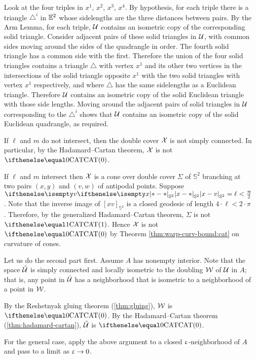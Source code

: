 Look at the four triples in $x^1$, $x^2$, $x^3$, $x^4$.
By  hypothesis, for each triple there is a triangle ${\triangle}^i$ in $\mathbb{E}^2$ whose  sidelengths are the three distances between pairs.
By the Arm Lemma, for each triple, $\mathcal{U}$ contains an isometric copy of the corresponding solid triangle.
Consider adjacent pairs of these solid triangles in $\mathcal{U}$, with common sides moving around the sides of the quadrangle in order.
The fourth solid triangle has a common side with the first.
Therefore the union of the four solid triangles contains a triangle $\triangle$ with vertex $x^1$ and its other two vertices in the intersections of the solid  triangle opposite $x^1$ with the two solid triangles with vertex $x^1$ respectively, and where $\triangle$ has the same sidelengths as a Euclidean triangle.
Therefore $\mathcal{U}$ contains an isometric copy of the solid Euclidean triangle with those side lengths.
Moving around the adjacent pairs of solid triangles in $\mathcal{U}$ corresponding to the ${\triangle}^i$ shows that $\mathcal{U}$ contains an isometric copy of the solid Euclidean quadrangle, as required.

If $\ell$ and $m$ do not intersect, then the double cover $\mathcal{X}$ is not simply connected.
In particular, by the Hadamard--Cartan theorem, $\mathcal{X}$ is not $\CAT0$.

If $\ell$ and $m$ intersect then $\mathcal{X}$ is a cone over double cover $\Sigma$ of $\mathbb{S}^2$ branching at two pairs $(x,y)$ and $(v,w)$ of antipodal points.
Suppose $\dist{x}{v}{\mathbb{S}^2}=\ell<\tfrac\pi2$.
Note that the inverse image of $[xv]_{\mathbb{S}^2}$ is a closed geodesic of length $4\cdot\ell<2\cdot\pi$.
Therefore, by the generalized Hadamard--Cartan theorem, $\Sigma$ is not $\CAT1$. Hence $\mathcal{X}$ is not $\CAT0$ by Theorem \ref{thm:warp-curv-bound:cat}  on curvature of cones.

Let us do the second part first.
Assume $A$ has nonempty interior. 
Note that the space $\tilde{\mathcal{U}}$ is simply connected and locally isometric to the doubling $\mathcal{W}$ of $\mathcal{U}$ in $A$;
that is, any point in $\tilde{\mathcal{U}}$ has a neighborhood 
that is isometric to a neighborhood of a point in $\mathcal{W}$.

By the Reshetnyak gluing theorem (\ref{thm:gluing}), $\mathcal{W}$ is $\CAT0$.
By the Hadamard--Cartan theorem (\ref{thm:hadamard-cartan}), $\tilde{\mathcal{U}}$ is $\CAT0$.

For the general case, apply the above argument to a closed $\upvarepsilon$-neighborhood of $A$
and pass to a limit as $\eps\to 0$.

